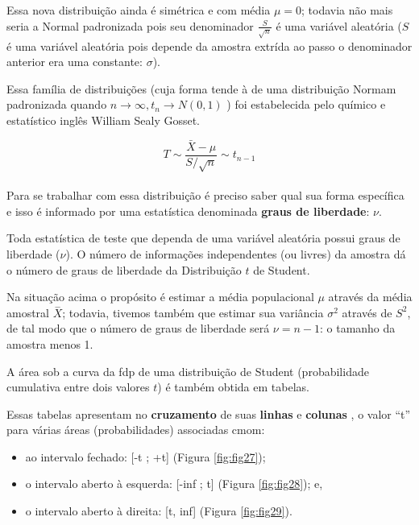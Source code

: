 \documentclass[
]{book}
\providecommand{\tightlist}{%
  \setlength{\itemsep}{0pt}\setlength{\parskip}{0pt}}
\begin{document}
Essa nova distribuição ainda é simétrica e com média \(\mu=0\); todavia não mais seria a Normal padronizada pois seu denominador \(\frac{S}{\sqrt{n}}\) é uma variável aleatória (\(S\) é uma variável aleatória pois depende da amostra extrída ao passo o denominador anterior era uma constante: \(\sigma\)).

\hfill\break

Essa família de distribuições (cuja forma tende à de uma distribuição Normam padronizada quando \(n \to \infty , t_{n} \to N(0,1)\) ) foi estabelecida pelo químico e estatístico inglês William Sealy Gosset.

\hfill\break

\[
T \sim \frac{\bar X -\mu}{S/\sqrt{n}} \sim t_{n-1}
\]\\

Para se trabalhar com essa distribuição é preciso saber qual sua forma específica e isso é informado por uma estatística denominada \textbf{graus de liberdade}: \(\nu\).

\hfill\break

Toda estatística de teste que dependa de uma variável aleatória possui graus de liberdade (\(\nu\)). O número de informações independentes (ou livres) da amostra dá o número de graus de liberdade da Distribuição \(t\) de Student.

\hfill\break

Na situação acima o propósito é estimar a média populacional \(\mu\) através da média amostral \(\stackrel{-}{X}\); todavia, tivemos também que estimar sua variância \(\sigma^{2}\) através de \(S^{2}\), de tal modo que o número de graus de liberdade será \(\nu=n-1\): o tamanho da amostra menos 1.

\hfill\break

A área sob a curva da fdp de uma distribuição de Student (probabilidade cumulativa entre dois valores \(t\)) é também obtida em tabelas.

\hfill\break

Essas tabelas apresentam no \textbf{cruzamento} de suas \textbf{linhas} e \textbf{colunas} , o valor ``t'' para várias áreas (probabilidades) associadas cmom:

\begin{itemize}
\tightlist
\item
  ao intervalo fechado: {[}-t ; +t{]} (Figura \ref{fig:fig27});\\
\item
  o intervalo aberto à esquerda: {[}-inf ; t{]} (Figura \ref{fig:fig28}); e,\\
\item
  o intervalo aberto à direita: {[}t, inf{]} (Figura \ref{fig:fig29}).
\end{itemize}
\end{document}
